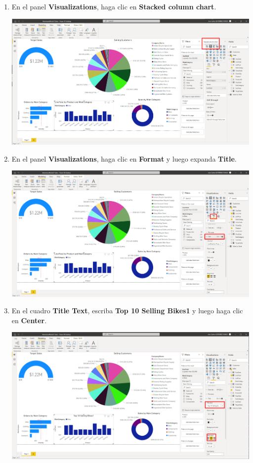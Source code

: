 \documentclass[12pt,letterpaper]{article}
\newcommand\tab[1][1cm]{\hspace*{#1}}
\begin{document}
\begin{enumerate}[\tab 1.]
\begin{center}
        \end{center}
        \item En el panel \textbf{Visualizations}, haga clic en \textbf{Stacked column chart}.
        \begin{center}
            \includegraphics[width=13cm]{./img/img111.png}
        \end{center}
        \item En el panel \textbf{Visualizations}, haga clic en \textbf{Format} y luego expanda \textbf{Title}.
        \begin{center}
            \includegraphics[width=13cm]{./img/img112.png}
        \end{center}
        \item En el cuadro \textbf{Title Text}, escriba \textbf{Top 10 Selling Bikes1} y luego haga clic en \textbf{Center}.
        \begin{center}
            \includegraphics[width=13cm]{./img/img113.png}

\end{center}
\end{enumerate}
\end{document}
